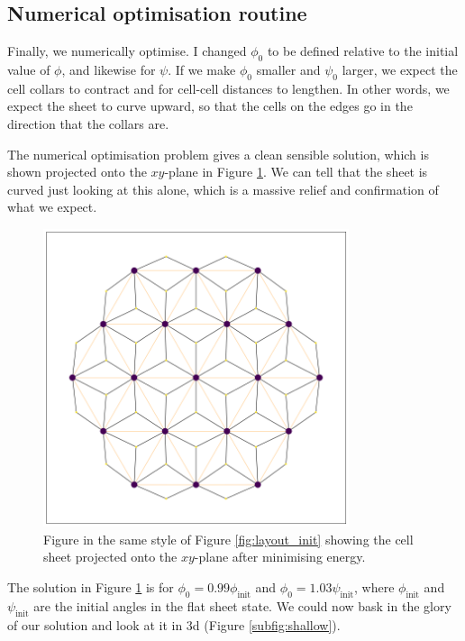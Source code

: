 \subsection{Numerical optimisation routine}

Finally, we numerically optimise. I changed $\phi_0$ to be defined relative to the initial value of $\phi$, and likewise for $\psi$. If we make $\phi_0$ smaller and $\psi_0$ larger, we expect the cell collars to contract and for cell-cell distances to lengthen. In other words, we expect the sheet to curve upward, so that the cells on the edges go in the direction that the collars are.

The numerical optimisation problem gives a clean sensible solution, which is shown projected onto the $xy$-plane in Figure \ref{fig:layout_curved}. We can tell that the sheet is curved just looking at this alone, which is a massive relief and confirmation of what we expect.

\begin{figure}[htbp]
    \centering
    \includegraphics[width=0.8\textwidth]{layout_curved.png}
    \caption{Figure in the same style of Figure \ref{fig:layout_init} showing the cell sheet projected onto the $xy$-plane after minimising energy. }
    \label{fig:layout_curved}
\end{figure}

The solution in Figure \ref{fig:layout_curved} is for $\phi_0 = 0.99 \phi_{\text{init}}$ and $\phi_0 = 1.03 \psi_{\text{init}}$, where $\phi_{\text{init}}$ and $\psi_{\text{init}}$ are the initial angles in the flat sheet state. We could now bask in the glory of our solution and look at it in 3d (Figure \ref{subfig:shallow}).

